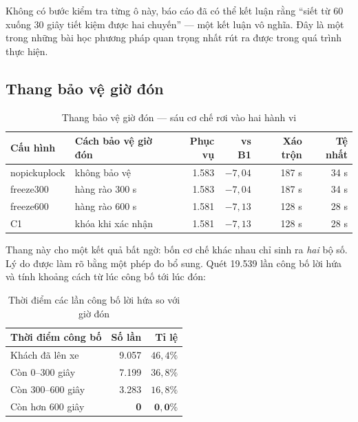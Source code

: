 Không có bước kiểm tra từng ô này, báo cáo đã có thể kết luận rằng ``siết từ 60 xuống 30 giây
tiết kiệm được hai chuyến'' --- một kết luận vô nghĩa. Đây là một trong những bài học phương
pháp quan trọng nhất rút ra được trong quá trình thực hiện.

\subsection{Thang bảo vệ giờ đón}

\begin{table}[htbp]
\centering
\caption{Thang bảo vệ giờ đón --- sáu cơ chế rơi vào hai hành vi}
\label{bang:thang2}
\small
\begin{tabular}{@{}llrrrr@{}}
\toprule
\textbf{Cấu hình} & \textbf{Cách bảo vệ giờ đón} & \textbf{Phục vụ} & \textbf{vs B1} & \textbf{Xáo trộn} & \textbf{Tệ nhất}\\
\midrule
nopickuplock & không bảo vệ & 1.583 & $-7{,}04$ & 187 s & 34 s\\
freeze300 & hàng rào 300 s & 1.583 & $-7{,}04$ & 187 s & 34 s\\
freeze600 & hàng rào 600 s & 1.581 & $-7{,}13$ & 128 s & 28 s\\
C1 & khóa khi xác nhận & 1.581 & $-7{,}13$ & 128 s & 28 s\\
\bottomrule
\end{tabular}
\end{table}

Thang này cho một kết quả bất ngờ: bốn cơ chế khác nhau chỉ sinh ra \emph{hai} bộ số. Lý do được
làm rõ bằng một phép đo bổ sung. Quét 19.539 lần công bố lời hứa và tính khoảng cách từ lúc công
bố tới lúc đón:

\begin{table}[htbp]
\centering
\caption{Thời điểm các lần công bố lời hứa so với giờ đón}
\label{bang:thoidiem}
\small
\begin{tabular}{@{}lrr@{}}
\toprule
\textbf{Thời điểm công bố} & \textbf{Số lần} & \textbf{Tỉ lệ}\\
\midrule
Khách đã lên xe & 9.057 & $46{,}4\%$\\
Còn 0--300 giây & 7.199 & $36{,}8\%$\\
Còn 300--600 giây & 3.283 & $16{,}8\%$\\
Còn hơn 600 giây & \textbf{0} & $\mathbf{0{,}0\%}$\\
\bottomrule
\end{tabular}
\end{table}

